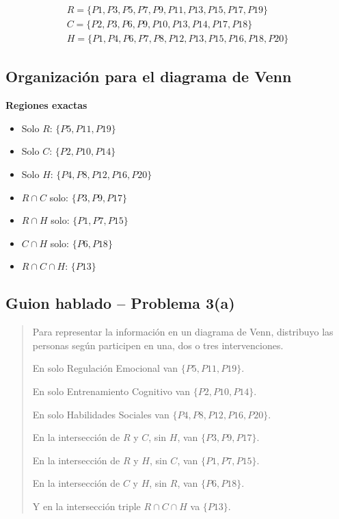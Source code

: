 \documentclass[12pt]{article}
\begin{document}
	\[
	\begin{array}{l}
		R = \{P1, P3, P5, P7, P9, P11, P13, P15, P17, P19\} \\[6pt]
		C = \{P2, P3, P6, P9, P10, P13, P14, P17, P18\} \\[6pt]
		H = \{P1, P4, P6, P7, P8, P12, P13, P15, P16, P18, P20\}
	\end{array}
	\]
	
	\subsection*{Organización para el diagrama de Venn}
	
	\textbf{Regiones exactas}
	\begin{itemize}
		\item Solo \(R\): \(\{P5,P11,P19\}\)
		\item Solo \(C\): \(\{P2,P10,P14\}\)
		\item Solo \(H\): \(\{P4,P8,P12,P16,P20\}\)
		\item \(R\cap C\) solo: \(\{P3,P9,P17\}\)
		\item \(R\cap H\) solo: \(\{P1,P7,P15\}\)
		\item \(C\cap H\) solo: \(\{P6,P18\}\)
		\item \(R\cap C\cap H\): \(\{P13\}\)
	\end{itemize}
	
	
\subsection*{Guion hablado -- Problema 3(a)}
	
	\begin{quote}
		Para representar la información en un diagrama de Venn, distribuyo las personas según participen en una, dos o tres intervenciones.
		
		En solo Regulación Emocional van \(\{P5,P11,P19\}\).
		
		En solo Entrenamiento Cognitivo van \(\{P2,P10,P14\}\).
		
		En solo Habilidades Sociales van \(\{P4,P8,P12,P16,P20\}\).
		
		En la intersección de \(R\) y \(C\), sin \(H\), van \(\{P3,P9,P17\}\).
		
		En la intersección de \(R\) y \(H\), sin \(C\), van \(\{P1,P7,P15\}\).
		
		En la intersección de \(C\) y \(H\), sin \(R\), van \(\{P6,P18\}\).
		
		Y en la intersección triple \(R\cap C\cap H\)  va \(\{P13\}\).
	\end{quote}
	
\end{document}

